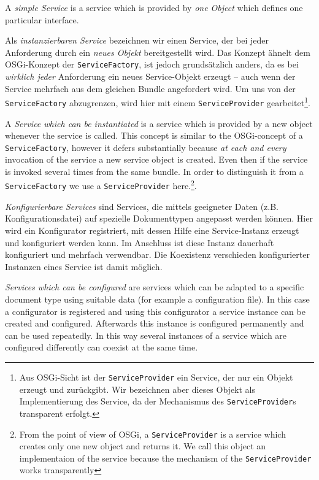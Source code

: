 \documentclass[10pt,a4paper]{scrartcl}
\providecommand{\deutsch}[1]{#1}
\providecommand{\englisch}[1]{{\sffamily #1}}
\begin{document}
\englisch{A \emph{simple Service} is a service which is provided by \emph{one Object} which defines one particular interface.}

\deutsch{Als \emph{instanzierbaren Service} bezeichnen wir einen Service, der
bei jeder Anforderung durch ein \emph{neues Objekt} bereitgestellt wird. Das
Konzept ähnelt dem OSGi-Konzept der \texttt{ServiceFactory}, ist jedoch
grundsätzlich anders, da es bei \emph{wirklich jeder} Anforderung ein neues
Service-Objekt erzeugt -- auch wenn der Service mehrfach aus dem gleichen Bundle
angefordert wird. Um uns von der \texttt{ServiceFactory} abzugrenzen, wird hier
mit einem \texttt{ServiceProvider} gearbeitet\footnote{Aus OSGi-Sicht ist der
\texttt{ServiceProvider} ein Service, der nur ein Objekt erzeugt und zurückgibt.
Wir bezeichnen aber dieses Objekt als Implementierung des Service, da der
Mechanismus des \texttt{ServiceProvider}s transparent erfolgt.}.}

\englisch{A \emph{Service which can be instantiated} is a service which is
provided by a new object whenever the service is called. This concept is similar
to the OSGi-concept of a \texttt{ServiceFactory}, however it defers
substantially because \emph{at each and every} invocation of the service a new
service object is created. Even then if the service is invoked several times
from the same bundle. In order to distinguish it from a \texttt{ServiceFactory}
we use a \texttt{ServiceProvider} here.\footnote{From the point of view of OSGi,
a \texttt{ServiceProvider} is a service which creates only one new object and
returns it. We call this object an implementaion of the service because the
mechanism of the \texttt{ServiceProvider} works transparently}.}

\deutsch{\emph{Konfigurierbare Services} sind Services, die mittels geeigneter Daten
(z.B. Konfigurationsdatei) auf spezielle Dokumenttypen angepasst werden können.
Hier wird ein Konfigurator registriert, mit dessen Hilfe eine Service-Instanz
erzeugt und konfiguriert werden kann. Im Anschluss ist diese Instanz dauerhaft
konfiguriert und mehrfach verwendbar. Die Koexistenz verschieden konfigurierter
Instanzen eines Service ist damit möglich.}

\englisch{\emph{Services which can be configured} are services which can be
adapted to a specific document type using suitable data (for example a
configuration file). In this case a configurator is registered and using this
configurator a service instance can be created and configured. Afterwards this
instance is configured permanently and can be used repeatedly. In this way
several instances of a service which are configured differently can coexist at
the same time.}
\end{document}
